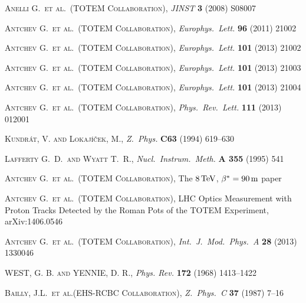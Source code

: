 \documentclass[pdftex,twocolumn,epjc3]{svjour3}
\def\un#1{\,{\rm #1}}
\def\etal{et al.}
\def\Name#1{\textsc{#1}, }
\def\REVIEW#1#2#3#4{{\it #1} {\bf #2} (#3) #4}
\begin{document}
\begin{thebibliography}{99}

	\Name{Anelli G.~\etal{}~(TOTEM Collaboration)}
	\REVIEW{JINST}{3}{2008}{S08007}

	\Name{Antchev G.~\etal{}~(TOTEM Collaboration)}
	\REVIEW{Europhys.~Lett.}{96}{2011}{21002}

	\Name{Antchev G.~\etal{}~(TOTEM Collaboration)}
	\REVIEW{Europhys.~Lett.}{101}{2013}{21002}

	\Name{Antchev G.~\etal{}~(TOTEM Collaboration)}
	\REVIEW{Europhys.~Lett.}{101}{2013}{21003}

	\Name{Antchev G.~\etal{}~(TOTEM Collaboration)}
	\REVIEW{Europhys.~Lett.}{101}{2013}{21004}

	\Name{Antchev G.~\etal{}~(TOTEM Collaboration)}
	\REVIEW{Phys.~Rev.~Lett.}{111}{2013}{012001}

	\Name{Kundr\' at, V. and Lokaj\' i\v cek, M.}
	\REVIEW{Z.~Phys.}{C63}{1994}{619--630}

	\Name{Lafferty G.~D.~and Wyatt T.~R.}
	\REVIEW{Nucl.\ Instrum.\ Meth.}{A 355}{1995}{541}

	\Name{Antchev G.~\etal{}~(TOTEM Collaboration)}
	The $8\un{TeV}$, $\beta^* = 90\un{m}$ paper

	\Name{Antchev G.~\etal{}~(TOTEM Collaboration)}
	LHC Optics Measurement with Proton Tracks Detected by the Roman Pots of the TOTEM Experiment, 
	arXiv:1406.0546

	\Name{Antchev G.~\etal{}~(TOTEM Collaboration)}
	\REVIEW{Int.~J.~Mod.~Phys.~A}{28}{2013}{1330046}

	\Name{WEST, G. B. and YENNIE, D. R.}
	\REVIEW{Phys. Rev.}{172}{1968}{1413--1422}

	\Name{Bailly, J.L.~\etal{}(EHS-RCBC Collaboration)}
	\REVIEW{Z.~Phys.~C}{37}{1987}{7--16}


\end{thebibliography}
\end{document}

